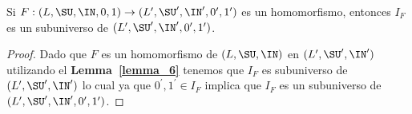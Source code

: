   \begin{lemma}
    \PN Si $F: (L, \SU, \IN, 0, 1) \rightarrow (L^{\prime}, \SU^{\prime}, \IN^{\prime}, 0^{\prime}, 1^{\prime})$ es un
    homomorfismo, entonces $I_{F}$ es un subuniverso de $(L^{\prime}, \SU^{\prime}, \IN^{\prime}, 0^{\prime},
    1^{\prime})$.
  \end{lemma}
  \begin{proof}
    \PN Dado que $F$ es un homomorfismo de $(L, \SU, \IN)$ en $ (L^{\prime}, \SU^{\prime}, \IN^{\prime})$ utilizando el
    \textbf{Lemma~\ref{lemma_6}} tenemos que $I_{F}$ es subuniverso de $(L^{\prime}, \SU^{\prime}, \IN^{\prime})$ lo
    cual ya que $0^{\prime}, 1^{\prime} \in I_{F}$ implica que $I_{F}$ es un subuniverso de $(L^{\prime}, \SU^{\prime},
    \IN^{\prime}, 0^{\prime}, 1^{\prime})$.
  \end{proof}

